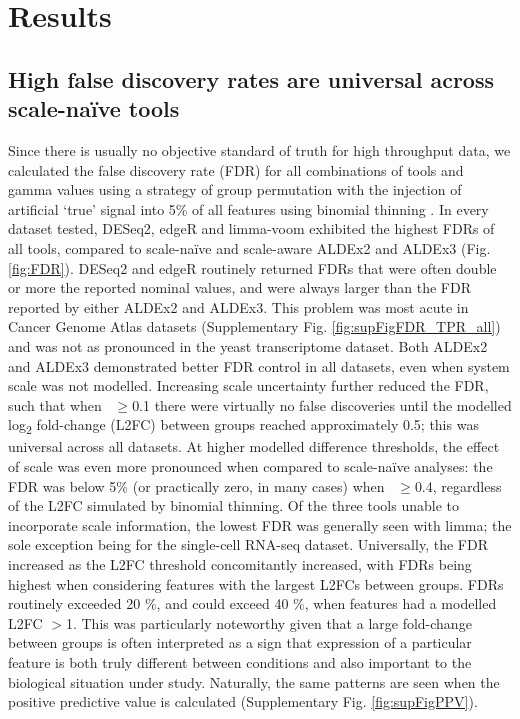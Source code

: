 \documentclass{article}
\begin{document}
\section{Results}

\subsection{High false discovery rates are universal across scale-na\"ive tools}
Since there is usually no objective standard of truth for high throughput data, we calculated the false discovery rate (FDR) for all combinations of tools and gamma values using a strategy of group permutation with the injection of artificial `true' signal into 5\% of all features using binomial thinning \cite{gerard_data-based_2020}. In every dataset tested, DESeq2, edgeR and limma-voom exhibited the highest FDRs of all tools, compared to scale-na\"ive and scale-aware ALDEx2 and ALDEx3 (Fig. \ref{fig:FDR}). DESeq2 and edgeR routinely returned FDRs that were often double or more the reported nominal values, and were always larger than the FDR reported by either ALDEx2 and ALDEx3. This problem was most acute in Cancer Genome Atlas datasets (Supplementary Fig. \ref{fig:supFigFDR_TPR_all}) and was not as pronounced in the yeast transcriptome dataset. Both ALDEx2 and ALDEx3 demonstrated better FDR control in all datasets, even when system scale was not modelled. Increasing scale uncertainty further reduced the FDR, such that when \textgamma~$\geq$0.1 there were virtually no false discoveries until the modelled log\textsubscript{2} fold-change (L2FC) between groups reached approximately 0.5; this was universal across all datasets. At higher modelled difference thresholds, the effect of scale was even more pronounced when compared to scale-na\"ive analyses: the FDR was below 5\% (or practically zero, in many cases) when \textgamma~$\geq$0.4, regardless of the L2FC simulated by binomial thinning. Of the three tools unable to incorporate scale information, the lowest FDR was generally seen with limma; the sole exception being for the single-cell RNA-seq dataset. Universally, the FDR increased as the L2FC threshold concomitantly increased, with FDRs being highest when considering features with the largest L2FCs between groups. FDRs routinely exceeded 20 \%, and could exceed 40 \%, when features had a modelled L2FC $>$1. This was particularly noteworthy given that a large fold-change between groups is often interpreted as a sign that expression of a particular feature is both truly different between conditions and also important to the biological situation under study. Naturally, the same patterns are seen when the positive predictive value is calculated (Supplementary Fig. \ref{fig:supFigPPV}).
\end{document}
